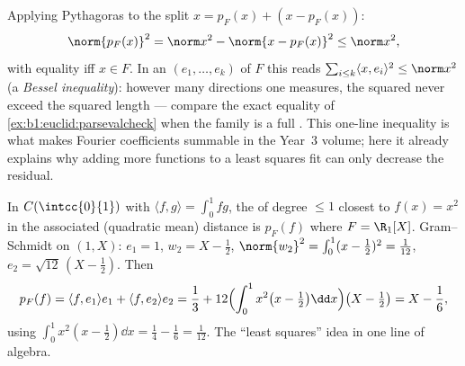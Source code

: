 \begin{example}
\label{ex:b1:euclid:bessel}
Applying Pythagoras to the split $x = p_F(x) + (x - p_F(x))$:
\[
\norm{p_F(x)}^2 = \norm x^2 - \norm{x - p_F(x)}^2 \leq
\norm x^2 ,
\]
with equality iff $x \in F$. In an   $(e_1,
\dots, e_k)$ of $F$ this reads $\sum_{i \leq k}\langle x,
e_i\rangle^2 \leq \norm x^2$ (a \emph{Bessel inequality}):
however many  directions one measures, the squared
 never exceed the squared length --- compare the
exact equality of \cref{ex:b1:euclid:parsevalcheck} when the
family is a full . This one-line inequality is what makes
Fourier coefficients summable in the Year~3 volume; here it
already explains why adding more  functions to a least
squares fit can only decrease the residual.
\end{example}

\begin{example}\label{ex:b1:euclid:bestapprox}
In $C(\intcc{0}{1})$ with $\langle f, g\rangle = \int_0^1 fg$, the
 of degree $\leq 1$ closest to $f(x) = x^2$ in the
associated (quadratic mean) distance is $p_F(f)$ where $F = \R_1[X]$.
Gram--Schmidt on $(1, X)$: $e_1 = 1$, $w_2 = X - \frac12$,
$\norm{w_2}^2 = \int_0^1 (x - \frac12)^2 = \frac{1}{12}$, $e_2 =
\sqrt{12}\,(X - \tfrac12)$. Then
\[
p_F(f) = \langle f, e_1\rangle e_1 + \langle f, e_2\rangle e_2
= \frac13 + 12\Bigl(\int_0^1 x^2\bigl(x - \tfrac12\bigr)\dd
x\Bigr)\bigl(X - \tfrac12\bigr)
= X - \frac{1}{6},
\]
using $\int_0^1 x^2(x - \frac12)\dd x = \frac14 - \frac16 =
\frac{1}{12}$. The ``least squares'' idea in one line of 
algebra.
\end{example}

